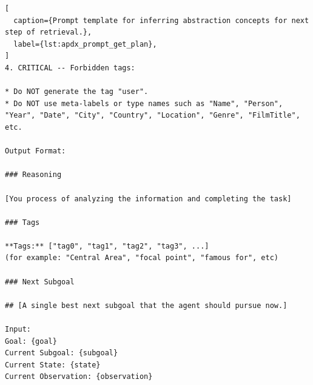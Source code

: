 \begin{lstlisting}[
  caption={Prompt template for inferring abstraction concepts for next step of retrieval.},
  label={lst:apdx_prompt_get_plan},
]
4. CRITICAL -- Forbidden tags:

* Do NOT generate the tag "user".
* Do NOT use meta-labels or type names such as "Name", "Person", "Year", "Date", "City", "Country", "Location", "Genre", "FilmTitle", etc.

Output Format:

### Reasoning

[You process of analyzing the information and completing the task]

### Tags

**Tags:** ["tag0", "tag1", "tag2", "tag3", ...]
(for example: "Central Area", "focal point", "famous for", etc)

### Next Subgoal

## [A single best next subgoal that the agent should pursue now.]

Input:
Goal: {goal}
Current Subgoal: {subgoal}
Current State: {state}
Current Observation: {observation}
\end{lstlisting}
